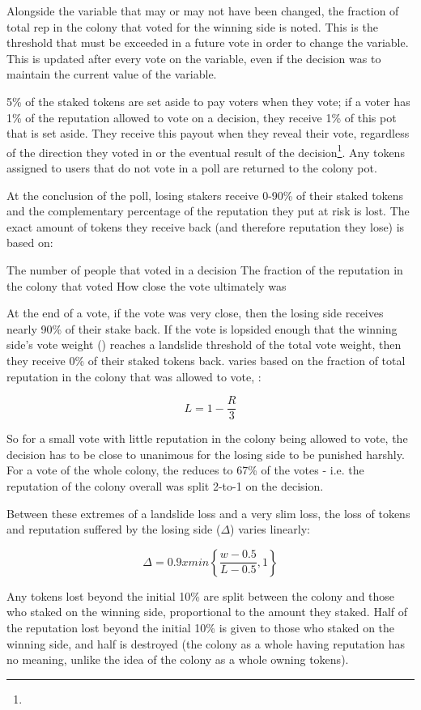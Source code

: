 Alongside the variable that may or may not have been changed, the fraction of total rep in the colony that voted for the winning side is noted. This is the threshold that must be exceeded in a future vote in order to change the variable. This is updated after every vote on the variable, even if the decision was to maintain the current value of the variable.

5\% of the staked tokens are set aside to pay voters when they vote; if a voter has 1\% of the reputation allowed to vote on a decision, they receive 1\% of this pot that is set aside. They receive this payout when they reveal their vote, regardless of the direction they voted in or the eventual result of the decision\footnote{}. Any tokens assigned to users that do not vote in a poll are returned to the colony pot.

At the conclusion of the poll, losing stakers receive 0-90\% of their staked tokens and the complementary percentage of the reputation they put at risk is lost. The exact amount of tokens they receive back (and therefore reputation they lose) is based on:

The number of people that voted in a decision
The fraction of the reputation in the colony that voted
How close the vote ultimately was

At the end of a vote, if the vote was very close, then the losing side receives nearly 90\% of their stake back. If the vote is lopsided enough that the winning side’s vote weight () reaches a landslide threshold  of the total vote weight, then they receive 0\% of their staked tokens back.  varies based on the fraction of total reputation in the colony that was allowed to vote, :

\[
L = 1 - \frac{R}{3}
\]

So for a small vote with little reputation in the colony being allowed to vote, the decision has to be close to unanimous for the losing side to be punished harshly. For a vote of the whole colony, the  reduces to 67\% of the votes - i.e. the reputation of the colony overall was split 2-to-1 on the decision.

Between these extremes of a landslide loss and a very slim loss, the loss of tokens and reputation suffered by the losing side ($\Delta$) varies linearly:

\[
 \Delta = 0.9 x min \left\lbrace \frac{w-0.5}{L-0.5}, 1 \right\rbrace
\]


Any tokens lost beyond the initial 10\% are split between the colony and those who staked on the winning side, proportional to the amount they staked. Half of the reputation lost beyond the initial 10\% is given to those who staked on the winning side, and half is destroyed (the colony as a whole having reputation has no meaning, unlike the idea of the colony as a whole owning tokens).



